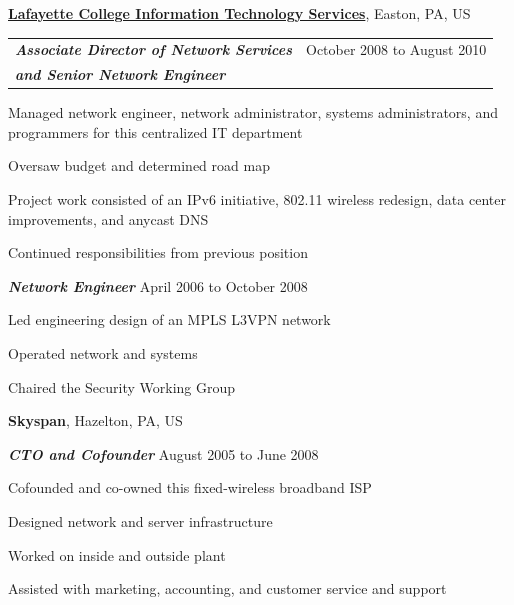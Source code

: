 \documentclass[10pt]{article}
\newenvironment{outerlist}[1][\enskip\textbullet]%
        {\begin{itemize}[#1]}{\end{itemize}%
         \vspace{-.6\baselineskip}}
\newenvironment{innerlist}[1][\enskip\textbullet]%
        {\begin{compactitem}[#1]}{\end{compactitem}}
\newcommand{\blankline}{\quad\pagebreak[2]}
\begin{document}
\blankline

\href{https://its.lafayette.edu}{\textbf{Lafayette College Information Technology Services}},
Easton, PA, US
\begin{outerlist}
\item[]
  \newlength{\rcoltitlelength}\setlength{\rcoltitlelength}{2.16in}
  \begin{tabular}[t]{@{}p{\textwidth-\rcoltitlelength} p{\rcoltitlelength}}
    \textit{\textbf{Associate Director of Network Services }} &
    October 2008 to August 2010 \\
    \textit{\textbf{and Senior Network Engineer}} & \\
  \end{tabular}
  \begin{innerlist}
  \item Managed network engineer, network administrator, systems administrators, and programmers for this centralized IT department
  \item Oversaw budget and determined road map
  \item Project work consisted of an IPv6 initiative, 802.11 wireless redesign, data center improvements, and anycast DNS
  \item Continued responsibilities from previous position
  \end{innerlist}

\item[] \textit{\textbf{Network Engineer}}
  \hfill April 2006 to October 2008
  \begin{innerlist}
  \item Led engineering design of an MPLS L3VPN network
  \item Operated network and systems
  \item Chaired the Security Working Group
  \end{innerlist}
\end{outerlist}

\blankline

\textbf{Skyspan},
Hazelton, PA, US
\begin{outerlist}
\item[] \textit{\textbf{CTO and Cofounder}}
  \hfill August 2005 to June 2008
  \begin{innerlist}
  \item Cofounded and co-owned this fixed-wireless broadband ISP
  \item Designed network and server infrastructure
  \item Worked on inside and outside plant
  \item Assisted with marketing, accounting, and customer service and support
  \end{innerlist}
\end{outerlist}
\end{document}
